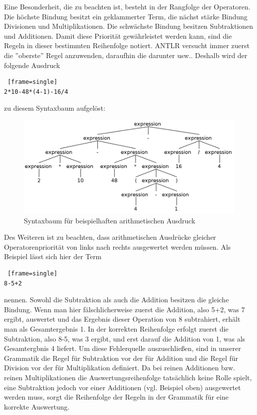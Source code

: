 \documentclass[12pt, a4paper, oneside, ngerman]{article}
\begin{document}
Eine Besonderheit, die zu beachten ist, besteht in der Rangfolge der Operatoren. Die höchste Bindung besitzt ein geklammerter Term, die nächst stärke Bindung Divisionen und Multiplikationen. Die schwächste Bindung besitzen Subtraktionen und Additionen. 
Damit diese Priorität gewährleistet werden kann, sind die Regeln in dieser bestimmten Reihenfolge notiert. ANTLR versucht immer zuerst die ''oberste'' Regel anzuwenden, daraufhin die darunter usw.. Deshalb wird der folgende Ausdruck 

\begin{lstlisting} [frame=single]
2*10-48*(4-1)-16/4
\end{lstlisting}

zu diesem Syntaxbaum aufgelöst:

\begin{figure}[h!]
\centering
\includegraphics[scale=0.4]{antlr4_parse_tree_arithmetic.png}
\caption{Syntaxbaum für beispielhaften arithmetischen Ausdruck}
\label{fig:method}
\end{figure}

Des Weiteren ist zu beachten, dass arithmetischen Ausdrücke gleicher Operatorenpriorität von links  nach rechts ausgewertet werden müssen. Als Beispiel lässt sich hier der Term 
\begin{lstlisting} [frame=single]
8-5+2
\end{lstlisting}
nennen. Sowohl die Subtraktion als auch die Addition besitzen die gleiche Bindung. Wenn man hier fälschlicherweise zuerst die Addition, also 5+2, was 7 ergibt, auswertet und das Ergebnis dieser Operation von 8 subtrahiert, erhält man als Gesamtergebnis 1. 
In der korrekten Reihenfolge erfolgt zuerst die Subtraktion, also 8-5, was 3 ergibt, und erst darauf die Addition von 1, was als Gesamtergbnis 4 liefert. 
Um diese Fehlerquelle auszuschließen, sind in unserer Grammatik die Regel für Subtraktion vor der für Addition und die Regel für Division vor der für Multiplikation definiert. Da bei reinen Additionen bzw. reinen Multiplikationen die Auswertungsreihenfolge tatsächlich keine Rolle spielt, eine Subtraktion jedoch vor einer Additionen (vgl. Beispiel oben) ausgewertet werden muss, sorgt die Reihenfolge der Regeln in der Grammatik für eine korrekte Auswertung.
\end{document}
